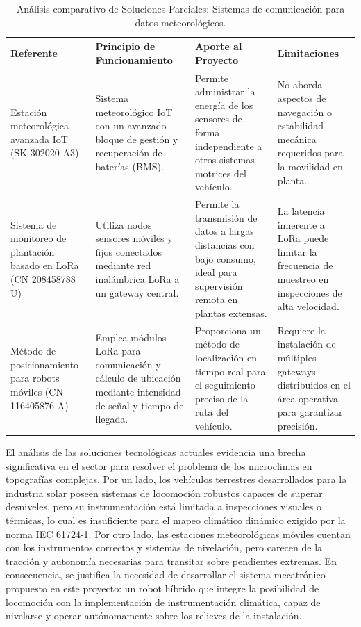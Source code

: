 %
%
\begin{table}[H]
	\centering
	\footnotesize
	\caption{Análisis comparativo de Soluciones Parciales: Sistemas de comunicación para datos meteorológicos.}
	\label{tab:estado_arte_comunicacion}
	\begin{tabularx}{\textwidth}{|p{3.5cm}|>{\raggedright\arraybackslash}X|>{\raggedright\arraybackslash}X|>{\raggedright\arraybackslash}X|}
		\hline
		\rowcolor[HTML]{D9E1F2} 
		\textbf{Referente} & \textbf{Principio de Funcionamiento} & \textbf{Aporte al Proyecto} & \textbf{Limitaciones} \\ \hline
		Estación meteorológica avanzada IoT (SK 302020 A3) & Sistema meteorológico IoT con un avanzado bloque de gestión y recuperación de baterías (BMS). & Permite administrar la energía de los sensores de forma independiente a otros sistemas motrices del vehículo. & No aborda aspectos de navegación o estabilidad mecánica requeridos para la movilidad en planta. \\ \hline
		Sistema de monitoreo de plantación basado en LoRa (CN 208458788 U) & Utiliza nodos sensores móviles y fijos conectados mediante red inalámbrica LoRa a un gateway central. & Permite la transmisión de datos a largas distancias con bajo consumo, ideal para supervisión remota en plantas extensas. & La latencia inherente a LoRa puede limitar la frecuencia de muestreo en inspecciones de alta velocidad. \\ \hline
		Método de posicionamiento para robots móviles (CN 116405876 A) & Emplea módulos LoRa para comunicación y cálculo de ubicación mediante intensidad de señal y tiempo de llegada. & Proporciona un método de localización en tiempo real para el seguimiento preciso de la ruta del vehículo. & Requiere la instalación de múltiples gateways distribuidos en el área operativa para garantizar precisión. \\ \hline
	\end{tabularx}
\end{table}

%
%
El análisis de las soluciones tecnológicas actuales evidencia una brecha significativa en el sector para resolver el problema de los microclimas en topografías complejas. Por un lado, los vehículos terrestres desarrollados para la industria solar poseen sistemas de locomoción robustos capaces de superar desniveles, pero su instrumentación está limitada a inspecciones visuales o térmicas, lo cual es insuficiente para el mapeo climático dinámico exigido por la norma IEC 61724-1. Por otro lado, las estaciones meteorológicas móviles cuentan con los instrumentos correctos y sistemas de nivelación, pero carecen de la tracción y autonomía necesarias para transitar sobre pendientes extremas. En consecuencia, se justifica la necesidad de desarrollar el sistema mecatrónico propuesto en este proyecto: un robot híbrido que integre la posibilidad de locomoción con la implementación de instrumentación climática, capaz de nivelarse y operar autónomamente sobre los relieves de la instalación.




